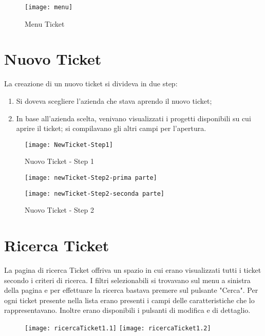 \begin{figure}[H]
	\centering
    \texttt{[image: menu]} 
    \caption{Menu Ticket}
\end{figure}

\newpage

\section{Nuovo Ticket}
La creazione di un nuovo ticket si divideva in due step:
\begin{enumerate}
\item Si doveva scegliere l'azienda che stava aprendo il nuovo ticket;
\item In base all'azienda scelta, venivano visualizzati i progetti disponibili su cui aprire il ticket; si compilavano gli altri campi per l'apertura.
\end{enumerate}

 
\begin{figure}[H]
\bigskip
	\centering
    \texttt{[image: NewTicket-Step1]} 
    \caption{Nuovo Ticket - Step 1}
\end{figure}

\begin{figure}[H]
\bigskip
	\centering
	
    \texttt{[image: newTicket-Step2-prima parte]} 
\end{figure}

\begin{figure}[H]
\bigskip
	\centering

        \texttt{[image: newTicket-Step2-seconda parte]} 
    \caption{Nuovo Ticket - Step 2}
\end{figure}

\bigskip
\section{Ricerca Ticket}
La pagina di ricerca Ticket offriva un spazio in cui erano visualizzati tutti i ticket secondo i criteri di ricerca. I filtri selezionabili si trovavano sul menu a sinistra della pagina e per effettuare la ricerca bastava premere sul pulsante "Cerca". Per ogni ticket presente nella lista erano presenti i campi delle caratteristiche che lo rappresentavano. Inoltre erano disponibili i pulsanti di modifica e di dettaglio.

\begin{figure}[H]
\bigskip
	\centering
    \texttt{[image: ricercaTicket1.1]} 
        \texttt{[image: ricercaTicket1.2]} 
\end{figure}

